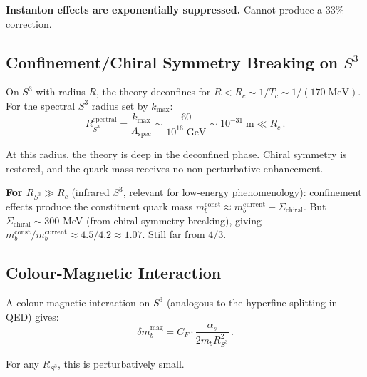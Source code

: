 \documentclass[11pt,a4paper]{article}
\begin{document}
\textbf{Instanton effects are exponentially suppressed.} Cannot produce a $33\%$ correction.

\subsection{Confinement/Chiral Symmetry Breaking on $S^3$}

On $S^3$ with radius $R$, the theory deconfines for $R < R_c \sim 1/T_c \sim 1/(170\;\mathrm{MeV})$. For the spectral $S^3$ radius set by $k_{\max}$:
\begin{equation}
R_{S^3}^{\mathrm{spectral}} = \frac{k_{\max}}{\Lambda_{\mathrm{spec}}} \sim \frac{60}{10^{16}\;\mathrm{GeV}} \sim 10^{-31}\;\mathrm{m} \ll R_c\,.
\end{equation}

At this radius, the theory is deep in the deconfined phase. Chiral symmetry is restored, and the quark mass receives no non-perturbative enhancement.

\textbf{For $R_{S^3} \gg R_c$} (infrared $S^3$, relevant for low-energy phenomenology): confinement effects produce the constituent quark mass $m_b^{\mathrm{const}} \approx m_b^{\mathrm{current}} + \Sigma_{\mathrm{chiral}}$. But $\Sigma_{\mathrm{chiral}} \sim 300$ MeV (from chiral symmetry breaking), giving $m_b^{\mathrm{const}}/m_b^{\mathrm{current}} \approx 4.5/4.2 \approx 1.07$. Still far from $4/3$.

\subsection{Colour-Magnetic Interaction}

A colour-magnetic interaction on $S^3$ (analogous to the hyperfine splitting in QED) gives:
\begin{equation}
\delta m_b^{\mathrm{mag}} = C_F \cdot \frac{\alpha_s}{2m_b R_{S^3}^2}\,.
\end{equation}

For any $R_{S^3}$, this is perturbatively small.
\end{document}
